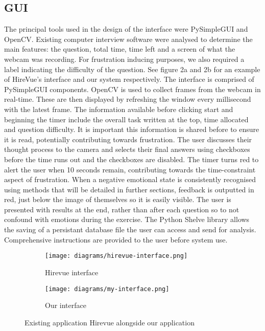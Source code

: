 \documentclass[12pt,a4paper]{article}
\begin{document}
\subsection*{GUI}
The principal tools used in the design of the interface were PySimpleGUI and OpenCV. Existing computer interview software were analysed to determine the main features: the question, total time, time left and a screen of what the webcam was recording. For frustration inducing purposes, we also required a label indicating the difficulty of the question. See figure 2a and 2b for an example of HireVue's interface and our system respectively. The interface is comprised of PySimpleGUI components. OpenCV is used to collect frames from the webcam in real-time. These are then displayed by refreshing the window every millisecond with the latest frame. The information available before clicking start and beginning the timer include the overall task written at the top, time allocated and question difficulty. It is important this information is shared before to ensure it is read, potentially contributing towards frustration. The user discusses their thought process to the camera and selects their final answers using checkboxes before the time runs out and the checkboxes are disabled. The timer turns red to alert the user when 10 seconds remain, contributing towards the time-constraint aspect of frustration. When a negative emotional state is consistently recognised using methods that will be detailed in further sections, feedback is outputted in red, just below the image of themselves so it is easily visible. The user is presented with results at the end, rather than after each question so to not confound with emotions during the exercise. The Python Shelve library allows the saving of a persistant database file the user can access and send for analysis. Comprehensive instructions are provided to the user before system use.


\begin{figure}
	\centering
	\begin{subfigure}{.5\textwidth}
		\centering
		\texttt{[image: diagrams/hirevue-interface.png]}
		\caption{Hirevue interface}
		\label{fig:sub1}
	\end{subfigure}%
	\begin{subfigure}{.5\textwidth}
		\centering
		\texttt{[image: diagrams/my-interface.png]}
		\caption{Our interface}
		\label{fig:sub2}
	\end{subfigure}
	\caption{Existing application Hirevue alongside our application}
	\label{fig:test}
\end{figure}
\end{document}
